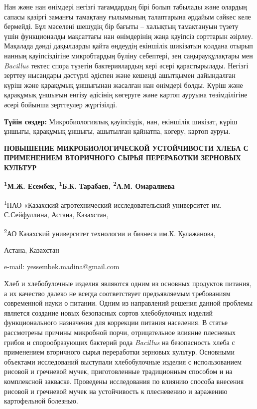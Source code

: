 Нан және нан өнімдері негізгі тағамдардың бірі болып табылады және
олардың сапасы қазіргі заманғы тамақтану ғылымының талаптарына әрдайым
сәйкес келе бермейді. Бұл мәселені шешудің бір бағыты -- халықтың
тамақтануын түзету үшін функционалды мақсаттағы нан өнімдерінің жаңа
қауіпсіз сорттарын әзірлеу. Мақалада дәнді дақылдарды қайта өңдеудің
екіншілік шикізатын қолдана отырып нанның қауіпсіздігіне микробтардың
бүліну себептері, зең саңырауқұлақтары мен \emph{Bacillus} тектес спора
түзетін бактериялардың кері әсері қарастырылады. Негізгі зерттеу
нысандары дәстүрлі әдіспен және кешенді ашытқымен дайындалған күріш және
қарақұмық ұншығынан жасалған нан өнімдері болды. Күріш және қарақұмық
ұншығын енгізу әдісінің көгеруге және картоп ауруына төзімділігіне әсері
бойынша зерттеулер жүргізілді.

{\bfseries Түйін сөздер:} Микробиологиялық қауіпсіздік, нан, екіншілік
шикізат, күріш ұншығы, қарақұмық ұншығы, ашытылған қайнатпа, көгеру,
картоп ауруы.

\begin{center}
{\large\bfseries ПОВЫШЕНИЕ МИКРОБИОЛОГИЧЕСКОЙ УСТОЙЧИВОСТИ ХЛЕБА С ПРИМЕНЕНИЕМ
ВТОРИЧНОГО СЫРЬЯ ПЕРЕРАБОТКИ ЗЕРНОВЫХ КУЛЬТУР}

{\bfseries \textsuperscript{1}М.Ж. Есембек, \textsuperscript{1}Б.К.
Тарабаев, \textsuperscript{2}А.М. Омаралиева}

\textsuperscript{1}НАО «Казахский агротехнический исследовательский
университет им. С.Сейфуллина, Астана, Казахстан,

\textsuperscript{2}АО Казахский университет технологии и бизнеса им.К.
Кулажанова,

Астана, Казахстан

e-mail: yessembek.madina@gmail.com
\end{center}

Хлеб и хлебобулочные изделия являются одним из основных продуктов
питания, а их качество далеко не всегда соответствует предъявляемым
требованиям современной науки о питании. Одним из направлений решения
данной проблемы является создание новых безопасных сортов хлебобулочных
изделий функционального назначения для коррекции питания населения. В
статье рассмотрены причины микробной порчи, отрицательное влияние
плесневых грибов и спорообразующих бактерий рода \emph{Bacillus} на
безопасность хлеба с применением вторичного сырья переработки зерновых
культур. Основными объектами исследований выступали хлебобулочные
изделия с использованием рисовой и гречневой мучек, приготовленные
традиционным способом и на комплексной закваске. Проведены исследования
по влиянию способа внесения рисовой и гречневой мучек на устойчивость к
плесневению и заражению картофельной болезнью.

